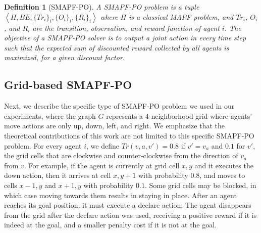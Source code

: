 \documentclass[letterpaper]{article} %
\newcommand{\tuple}[1]{\ensuremath{\left \langle #1 \right \rangle }}
\newcommand{\roni}[1]{ }
\newtheorem{definition}{Definition}
\begin{document}
\begin{definition}[SMAPF-PO]
A SMAPF-PO problem is a tuple $\tuple{\Pi,BE,\{Tr_i\}_i, \{O_i\}_i, \{R_i\}_i}$ where $\Pi$ is a classical MAPF problem, and $Tr_i$, $O_i$, and $R_i$ are the transition, observation, and reward function of agent $i$.
The objective of a SMAPF-PO solver is to output a joint action in every time step such that the expected sum of discounted reward collected by all agents is maximized, for a given discount factor.
\end{definition}



\subsection{Grid-based SMAPF-PO}

Next, we describe the specific type of SMAPF-PO problem we used in our experiments, where the graph $G$ represents a 4-neighborhood grid where agents' move actions are only up, down, left, and right. We emphasize that the theoretical contributions of this work are not limited to this specific SMAPF-PO problem.
For every agent $i$, we define $Tr(v,a,v')=0.8$ if $v'=v_a$ and $0.1$ for $v'$, the grid cells that are clockwise and counter-clockwise from the direction of $v_a$ from $v$.
For example, if the agent is currently at grid cell $x,y$ and it executes the down action, then it arrives at cell $x,y+1$ with probability $0.8$, and moves to cells $x-1,y$ and $x+1,y$ with probability $0.1$.
Some grid cells may be blocked, in which case moving towards them results in staying in place.
After an agent reaches its goal position, it must execute a declare action. The agent disappears from the grid after the declare action was used, receiving a positive reward if it is indeed at the goal, and a smaller penalty cost if it is not at the goal.
\end{document}
